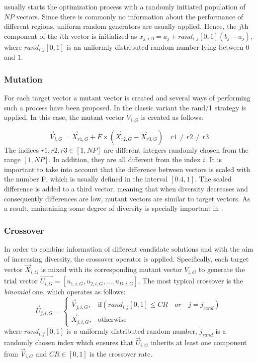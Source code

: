 \DE{} usually starts the optimization process with a randomly initiated population of $NP$ vectors.
%
Since there is commonly no information about the performance of different regions, uniform random generators are usually applied.
%
Hence, the $j$th component of the $i$th vector is initialized as $x_{j,i,0} = a_{j} + rand_{i,j}[0,1] (b_{j} - a_{j})$,
where $rand_{i,j}[0,1]$ is an uniformly distributed random number lying between $0$ and $1$.

\subsubsection{Mutation}

For each target vector a mutant vector is created and several ways of performing
such a process have been proposed.
%
In the classic \DE{} variant the rand/1 strategy is applied.
%
In this case, the mutant vector $V_{i,G}$ is created as follows:

\begin{equation}\label{eqn:mutation}
\vec{V}_{i,G} = \vec{X}_{r1, G} + F \times (\vec{X}_{r2, G} - \vec{X}_{r3, G}) \quad r1 \neq r2 \neq r3
\end{equation}
%
The indices $r1, r2, r3 \in [1,NP]$ are different integers randomly chosen from the range $[1, NP]$.
%
In addition, they are all different from the index $i$.
%
It is important to take into account that the difference between vectors is scaled with the number F, which is usually defined in the interval $[0.4, 1]$.
%
The scaled difference is added to a third vector, meaning that
when diversity decreases and consequently differences are low, mutant vectors are similar to target vectors.
%
As a result, maintaining some degree of diversity is specially important in \DE{}.

\subsubsection{Crossover}

In order to combine information of different candidate solutions and with the aim of increasing diversity, the crossover
operator is applied.
%
Specifically, each target vector $\vec{X}_{i,G}$ is mixed with its corresponding mutant vector $V_{i,G}$ to 
generate the trial vector $\vec{U_{i,G}} = [u_{1,i,G},u_{2,i,G}, ..., u_{D,i,G} ]$.
%
The most typical crossover is the \textit{binomial} one, which operates as follows:
%
\begin{equation} \label{eqn:crossover}
\vec{U}_{j,i,G}= 
\begin{cases}
    \vec{V}_{j,i,G},& \text{if} (rand_{i,j}[0,1] \leq CR \quad or \quad j = j_{rand}  )\\
    \vec{X}_{j,i,G},              & \text{otherwise}
\end{cases}
\end{equation}
where $rand_{i,j}[0,1]$ is a uniformly distributed random number,
$j_{rand}$ is a randomly chosen index which ensures that $\vec{U}_{i,G}$ inherits at least one component from $\vec{V}_{i,G}$ and
$CR \in [0,1]$ is the crossover rate.


